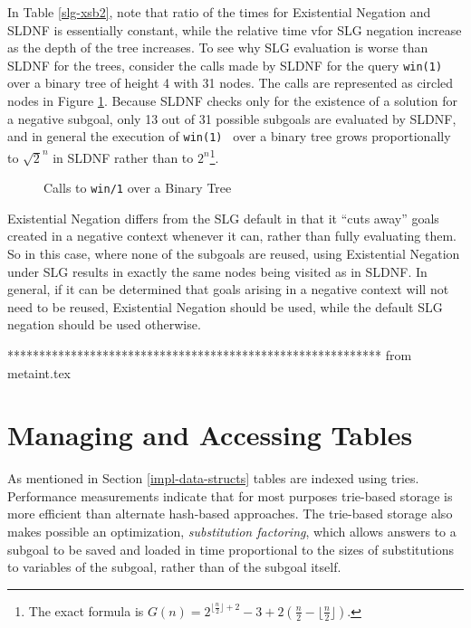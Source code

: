 In Table \ref{slg-xsb2}, note that ratio of the times for Existential
Negation and SLDNF is essentially constant, while the relative time
vfor SLG negation increase as the depth of the tree increases.  To see
why SLG evaluation is worse than SLDNF for the trees, consider the
calls made by SLDNF for the query {\tt win(1)} over a binary tree of
height 4 with 31 nodes.  The calls are represented as circled nodes in
Figure \ref{winbtree.eps}.  Because SLDNF checks only for the
existence of a solution for a negative subgoal, only 13 out of 31
possible subgoals are evaluated by SLDNF, and in general the execution
of {\tt win(1) } over a binary tree grows proportionally to
$\sqrt{2}^{n}$ in SLDNF rather than to $2^{n}$\footnote{The exact
formula is $G(n) =
2^{\lfloor\frac{n}{2}\rfloor+2}-3+2(\frac{n}{2}-\lfloor\frac{n}{2}\rfloor)$.}.

\begin{figure}[htb]
\centerline{}
\caption{Calls to {\tt win/1} over a Binary Tree}\label{winbtree.eps}
\end{figure}

Existential Negation differs from the SLG default in that it ``cuts
away'' goals created in a negative context whenever it can, rather
than fully evaluating them.  So in this case, where none of the
subgoals are reused, using Existential Negation under SLG results in
exactly the same nodes being visited as in SLDNF. In general, if it
can be determined that goals arising in a negative context will not
need to be reused, Existential Negation should be used, while the
default SLG negation should be used otherwise.

***********************************************************
from metaint.tex

\section{Managing and Accessing Tables}\label{impl-tab-man}

As mentioned in Section \ref{impl-data-structs} tables are indexed
using tries.  Performance measurements indicate that for most purposes
trie-based storage is more efficient than alternate hash-based
approaches.  The trie-based storage also makes possible an
optimization, {\em substitution factoring}, which allows answers to a
subgoal to be saved and loaded in time proportional to the sizes of
substitutions to variables of the subgoal, rather than of the subgoal
itself.

